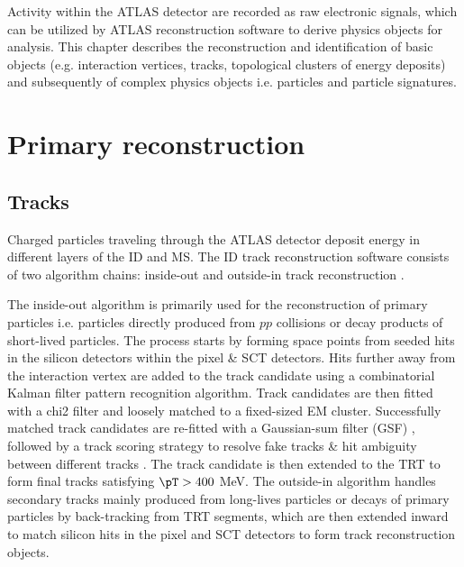 \documentclass[../thesis.tex]{subfiles}
\begin{document}
\vspace{-1\baselineskip}

Activity within the \acs{ATLAS} detector are recorded as raw electronic signals, which can be utilized by \acs{ATLAS} reconstruction software to derive physics objects for analysis. This chapter describes the reconstruction and identification of basic objects (e.g. interaction vertices, tracks, topological clusters of energy deposits) and subsequently of complex physics objects i.e. particles and particle signatures.

\section{Primary reconstruction}
\label{sec:primaryreco}

\subsection{Tracks}

Charged particles traveling through the ATLAS detector deposit energy in different layers of the \acs{ID} and \acs{MS}. The \acs{ID} track reconstruction software consists of two algorithm chains: inside-out and outside-in track reconstruction \citep{reco:track,reco:io,reco:oi}.

The inside-out algorithm is primarily used for the reconstruction of primary particles i.e. particles directly produced from $pp$ collisions or decay products of short-lived particles. The process starts by forming space points from seeded hits in the silicon detectors within the pixel \& \acs{SCT} detectors. Hits further away from the interaction vertex are added to the track candidate using a combinatorial Kalman filter \citep{reco:kalman} pattern recognition algorithm. Track candidates are then fitted with a \acs{chi2} filter \citep{reco:track_chi2} and loosely matched to a fixed-sized \acs{EM} cluster. Successfully matched track candidates are re-fitted with a Gaussian-sum filter (\acs{GSF}) \citep{reco:track_gsf}, followed by a track scoring strategy to resolve fake tracks \& hit ambiguity between different tracks \citep{reco:track_ambiguity}. The track candidate is then extended to the \acs{TRT} to form final tracks satisfying $\pT > 400$ MeV. The outside-in algorithm handles secondary tracks mainly produced from long-lives particles or decays of primary particles by back-tracking from \acs{TRT} segments, which are then extended inward to match silicon hits in the pixel and \acs{SCT} detectors to form track reconstruction objects.
\end{document}

